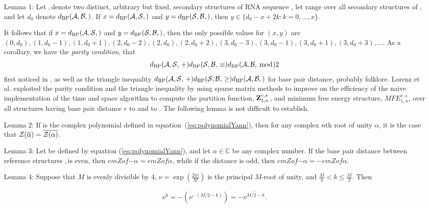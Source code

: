 \noindent
{\sc Lemma 1:} Let \strA,\,\strB denote two distinct, arbitrary but fixed,
 secondary structures of RNA sequence \seq, let \str range over
all secondary structures of \seq, and let $d_0$ denote $\dBP{\strA,\strB}$.
If $x=\dBP{\strA,\str}$ and $y=\dBP{\str,\strB}$, then
$y \in \{ d_0-x+2k: k=0,\dots,x\}$.
\medskip

\noindent
It follows that if $x=\dBP{\strA,\str}$ and $y=\dBP{\str,\strB}$,
then the only possible values for
$(x,y)$ are $(0,d_0), (1,d_0-1), (1,d_0+1),
(2,d_0-2), (2,d_0), (2, d_0+2),
(3,d_0-3), (3,d_0-1), (3, d_0+1), (3,d_0+3), \dots$.
As a corollary, we have the {\em parity condition}, that
\begin{align}
\label{eq:parity}
\dBP{\strA,\str} + \dBP{\str,\strB} \equiv \dBP{\strA,\strB} \bmod 2
\end{align}
first noticed in \cite{hofacker:RNAbor2D}, as well as
the triangle inequality
$\dBP{\strA,\str} + \dBP{\str,\strB} \geq \dBP{\strA,\strB}$
for base pair distance, probably folklore.
Lorenz et al. \cite{hofacker:RNAbor2D} exploited the parity condition
and the triangle inequality by using sparse matrix methods to improve on
the efficiency of the naive  implementation of the
 time and  space algorithm to compute
the partition function, ${\bf Z}^{r,s}_{1,n}$,
and minimum free energy structure, $MFE^{r,s}_{1,n}$, over all
structures having base pair distance $r$ to \strA and \str to \strB.
The following lemma is not difficult to establish.
\medskip

\noindent
{\sc Lemma 2:} If \emZ{} is the complex polynomial defined in
equation~(\ref{eq:polynomialYann}), then for any complex $n$th root of
unity $\alpha$, it is the case that ${\mathcal Z}_{}(\overline{\alpha}) =
\overline{{\mathcal Z}_{}(\alpha)}$.
\medskip

\noindent
{\sc Lemma 3:}
Let \emZ{} be defined by equation (\ref{eq:polynomialYann}), and
let $\alpha \in \mathbb{C}$ be any complex number.
If the base pair distance between reference
structures \strA,\,\strB is even, then $emZof{}{-\alpha} = emZof{}{\alpha}$, while if
the distance is odd, then $emZof{}{-\alpha} = -emZof{}{\alpha}$.
\medskip

\noindent
{\sc Lemma 4:} Suppose that $M$ is evenly divisible by $4$,
$\nu = \exp(\frac{2 \pi i}{M})$ is the principal $M$-root of unity, and
$\frac{M}{4} < k \leq \frac{M}{2}$. Then

\begin{align}
\nu^k = -(\nu^{-(M/2-k)}) = - \overline{\nu^{M/2-k}}.
\end{align}
\medskip

